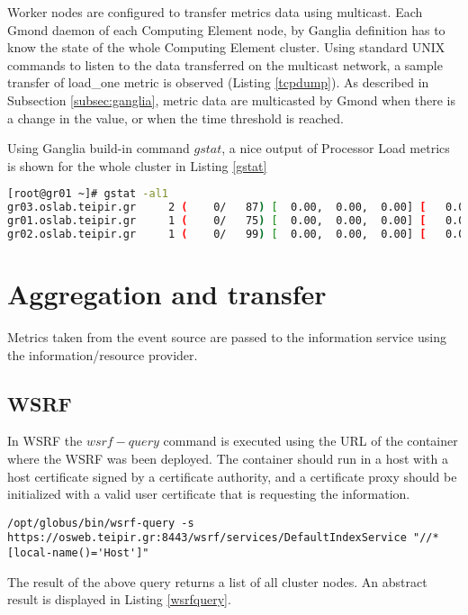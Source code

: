 Worker nodes are configured to transfer metrics data using multicast. Each Gmond daemon of each Computing Element node, by Ganglia definition has to know the state of the whole Computing Element cluster. Using standard UNIX commands to listen to the data transferred on the multicast network, a sample transfer of load\_one metric is observed (Listing \ref{tcpdump}). As described in Subsection \ref{subsec:ganglia}, metric data are multicasted by Gmond when there is a change in the value, or when the time threshold is reached.

Using Ganglia build-in command $gstat$, a nice output of Processor Load metrics is shown for the whole cluster in Listing \ref{gstat}

\begin{lstlisting}[language=bash,caption=Gstat output,label=gstat]
[root@gr01 ~]# gstat -al1
gr03.oslab.teipir.gr     2 (    0/   87) [  0.00,  0.00,  0.00] [   0.0,   0.0,   0.0,  99.9,   0.1]
gr01.oslab.teipir.gr     1 (    0/   75) [  0.00,  0.00,  0.00] [   0.0,   0.0,   0.0,  99.9,   0.0]
gr02.oslab.teipir.gr     1 (    0/   99) [  0.00,  0.00,  0.00] [   0.0,   0.0,   0.1,  99.9,   0.0]
\end{lstlisting}

\section{Aggregation and transfer}

Metrics taken from the event source are passed to the information service using the information/resource provider.

\subsection{WSRF}

In WSRF the $wsrf-query$ command is executed using the URL of the container where the WSRF was been deployed. The container should run in a host with a host certificate signed by a certificate authority, and a certificate proxy should be initialized with a valid user certificate that is requesting the information. 

\begin{lstlisting}
/opt/globus/bin/wsrf-query -s https://osweb.teipir.gr:8443/wsrf/services/DefaultIndexService "//*[local-name()='Host']"
\end{lstlisting}

The result of the above query returns a list of all cluster nodes. An abstract result is displayed in Listing \ref{wsrfquery}.

